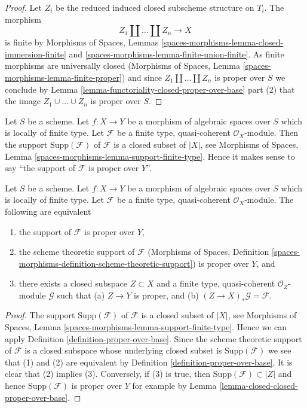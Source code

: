 \begin{proof}
Let $Z_i$ be the reduced induced closed subscheme structure on $T_i$.
The morphism
$$
Z_1 \amalg \ldots \amalg Z_n \longrightarrow X
$$
is finite by Morphisms of Spaces, Lemmas
\ref{spaces-morphisms-lemma-closed-immersion-finite} and
\ref{spaces-morphisms-lemma-finite-union-finite}.
As finite morphisms are universally closed
(Morphisms of Spaces, Lemma \ref{spaces-morphisms-lemma-finite-proper})
and since $Z_1 \amalg \ldots \amalg Z_n$ is proper over $S$
we conclude by
Lemma \ref{lemma-functoriality-closed-proper-over-base} part (2)
that the image $Z_1 \cup \ldots \cup Z_n$ is proper over $S$.
\end{proof}

\noindent
Let $S$ be a scheme.
Let $f : X \to Y$ be a morphism of algebraic spaces over $S$
which is locally
of finite type. Let $\mathcal{F}$ be a finite type, quasi-coherent
$\mathcal{O}_X$-module. Then the support $\text{Supp}(\mathcal{F})$
of $\mathcal{F}$ is a closed subset of $|X|$, see
Morphisms of Spaces, Lemma \ref{spaces-morphisms-lemma-support-finite-type}.
Hence it makes sense to say
``the support of $\mathcal{F}$ is proper over $Y$''.

\begin{lemma}
\label{lemma-module-support-proper-over-base}
Let $S$ be a scheme. Let $f : X \to Y$ be a morphism of
algebraic spaces over $S$ which is locally of finite type.
Let $\mathcal{F}$ be a finite type, quasi-coherent
$\mathcal{O}_X$-module. The following are equivalent
\begin{enumerate}
\item the support of $\mathcal{F}$ is proper over $Y$,
\item the scheme theoretic support of $\mathcal{F}$
(Morphisms of Spaces, Definition
\ref{spaces-morphisms-definition-scheme-theoretic-support})
is proper over $Y$, and
\item there exists a closed subspace $Z \subset X$ and
a finite type, quasi-coherent $\mathcal{O}_Z$-module
$\mathcal{G}$ such that (a) $Z \to Y$ is proper, and (b)
$(Z \to X)_*\mathcal{G} = \mathcal{F}$.
\end{enumerate}
\end{lemma}

\begin{proof}
The support $\text{Supp}(\mathcal{F})$ of $\mathcal{F}$ is a closed subset
of $|X|$, see Morphisms of Spaces, Lemma
\ref{spaces-morphisms-lemma-support-finite-type}.
Hence we can apply Definition \ref{definition-proper-over-base}.
Since the scheme theoretic support of $\mathcal{F}$ is a closed
subspace whose underlying closed subset is $\text{Supp}(\mathcal{F})$
we see that (1) and (2) are equivalent by
Definition \ref{definition-proper-over-base}.
It is clear that (2) implies (3).
Conversely, if (3) is true, then
$\text{Supp}(\mathcal{F}) \subset |Z|$
and hence $\text{Supp}(\mathcal{F})$
is proper over $Y$ for example by
Lemma \ref{lemma-closed-closed-proper-over-base}.
\end{proof}

